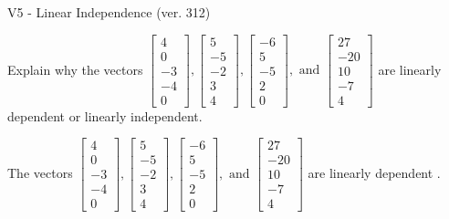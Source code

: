 \begin{exercise}
  \begin{exerciseTitle}V5 - Linear Independence (ver. 312)\end{exerciseTitle}
  \begin{exerciseStatement}
    Explain why the vectors \(\left[\begin{array}{r}
4 \\
0 \\
-3 \\
-4 \\
0
\end{array}\right] , \left[\begin{array}{r}
5 \\
-5 \\
-2 \\
3 \\
4
\end{array}\right] , \left[\begin{array}{r}
-6 \\
5 \\
-5 \\
2 \\
0
\end{array}\right] , \text{ and } \left[\begin{array}{r}
27 \\
-20 \\
10 \\
-7 \\
4
\end{array}\right]\) are linearly dependent or linearly independent.	


  \end{exerciseStatement}
  \begin{exerciseAnswer}
   The vectors \(\left[\begin{array}{r}
4 \\
0 \\
-3 \\
-4 \\
0
\end{array}\right] , \left[\begin{array}{r}
5 \\
-5 \\
-2 \\
3 \\
4
\end{array}\right] , \left[\begin{array}{r}
-6 \\
5 \\
-5 \\
2 \\
0
\end{array}\right] , \text{ and } \left[\begin{array}{r}
27 \\
-20 \\
10 \\
-7 \\
4
\end{array}\right]\) are 
  	 linearly dependent  .
  


  \end{exerciseAnswer}
\end{exercise}